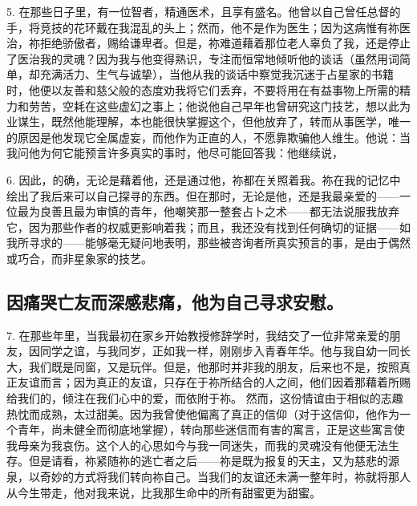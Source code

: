 5. 在那些日子里，有一位智者，精通医术，且享有盛名。他曾以自己曾任总督的手，将竞技的花环戴在我混乱的头上；然而，他不是作为医生；因为这病惟有祢医治，祢拒绝骄傲者，赐给谦卑者。但是，祢难道藉着那位老人辜负了我，还是停止了医治我的灵魂？因为我与他变得熟识，专注而恒常地倾听他的谈话（虽然用词简单，却充满活力、生气与诚挚），当他从我的谈话中察觉我沉迷于占星家的书籍时，他便以友善和慈父般的态度劝我将它们丢弃，不要将用在有益事物上所需的精力和劳苦，空耗在这些虚幻之事上；他说他自己早年也曾研究这门技艺，想以此为业谋生，既然他能理解，本也能很快掌握这个，但他放弃了，转而从事医学，唯一的原因是他发现它全属虚妄，而他作为正直的人，不愿靠欺骗他人维生。他说：当我问他为何它能预言许多真实的事时，他尽可能回答我：他继续说，\par

6. 因此，的确，无论是藉着他，还是通过他，祢都在关照着我。祢在我的记忆中绘出了我后来可以自己探寻的东西。但在那时，无论是他，还是我最亲爱的——一位最为良善且最为审慎的青年，他嘲笑那一整套占卜之术——都无法说服我放弃它，因为那些作者的权威更影响着我；而且，我还没有找到任何确切的证据——如我所寻求的——能够毫无疑问地表明，那些被咨询者所真实预言的事，是由于偶然或巧合，而非星象家的技艺。\par


\subsection{因痛哭亡友而深感悲痛，他为自己寻求安慰。}

7. 在那些年里，当我最初在家乡开始教授修辞学时，我结交了一位非常亲爱的朋友，因同学之谊，与我同岁，正如我一样，刚刚步入青春年华。他与我自幼一同长大，我们既是同窗，又是玩伴。但是，他那时并非我的朋友，后来也不是，按照真正友谊而言；因为真正的友谊，只存在于祢所结合的人之间，他们因着那藉着所赐给我们的，倾注在我们心中的爱，而依附于祢。 然而，这份情谊由于相似的志趣热忱而成熟，太过甜美。因为我曾使他偏离了真正的信仰（对于这信仰，他作为一个青年，尚未健全而彻底地掌握），转向那些迷信而有害的寓言，正是这些寓言使我母亲为我哀伤。这个人的心思如今与我一同迷失，而我的灵魂没有他便无法生存。但是请看，祢紧随祢的逃亡者之后——祢是既为报复的天主，又为慈悲的源泉，以奇妙的方式将我们转向祢自己。当我们的友谊还未满一整年时，祢就将那人从今生带走，他对我来说，比我那生命中的所有甜蜜更为甜蜜。\par

